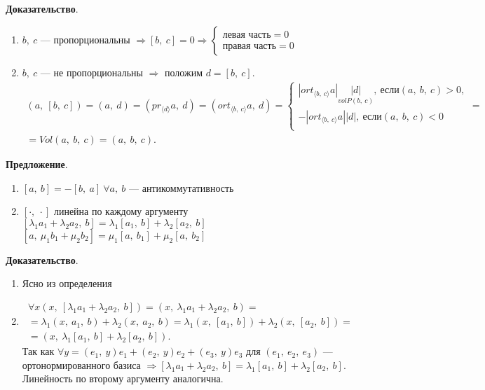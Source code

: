 \documentclass[a4paper, 12pt]{article}
\begin{document}
\textbf{Доказательство}.
\vspace{-3mm}
\begin{enumerate}
\itemsep=0em
\item $b,\ c$ --- пропорциональны $\Longrightarrow [b,\ c] = 0 \Longrightarrow \begin{cases*}
\text{левая часть} = 0 \\
\text{правая часть} = 0
\end{cases*}$
\item $b,\ c$ --- не пропорциональны $\Longrightarrow$ положим $d = [b,\ c]$.
\vspace{-3mm}
\begin{gather*}
(a,\ [b,\ c]) = (a,\ d) = (pr_{\langle d \rangle}a,\ d) = (ort_{\langle b,\ c \rangle}a,\ d) = \begin{cases*}
|ort_{\langle b,\ c \rangle}a|\underset{volP(b,\ c)}{|d|},\ \text{если} (a,\ b,\ c) > 0, \\
-|ort_{\langle b,\ c \rangle}a||d|,\ \text{если} (a,\ b,\ c) < 0 \\
\end{cases*} = \\
= Vol(a,\ b,\ c) = (a,\ b,\ c).
\end{gather*}
\end{enumerate}

\textbf{Предложение}.
\vspace{-3mm}
\begin{enumerate}
\itemsep=-0.3em
\item $[a,\ b] = -[b,\ a]\ \forall a,\ b$ --- антикоммутативность
\item $[\cdot,\ \cdot]$ линейна по каждому аргументу \\
$[\lambda_1 a_1 + \lambda_2 a_2,\ b] = \lambda_1[a_1,\ b] + \lambda_2[a_2,\ b]$ \\
$[a,\ \mu_1b_1 + \mu_2b_2] = \mu_1[a,\ b_1] + \mu_2[a,\ b_2]$
\end{enumerate}

\textbf{Доказательство}.
\vspace{-3mm}
\begin{enumerate}
\itemsep=0em
\item Ясно из определения
\item
\begin{gather*}
\forall x (x,\ [\lambda_1a_1 + \lambda_2a_2,\ b]) = (x,\ \lambda_1a_1 + \lambda_2a_2,\ b) = \\ = \lambda_1(x,\ a_1,\ b) + \lambda_2(x,\ a_2,\ b) = \lambda_1(x,\ [a_1,\ b]) + \lambda_2(x,\ [a_2,\ b]) = \\ = (x,\ \lambda_1[a_1,\ b] + \lambda_2[a_2,\ b]).
\end{gather*}
Так как $\forall y = (e_1,\ y)e_1 + (e_2,\ y)e_2 + (e_3,\ y)e_3$ для $(e_1,\ e_2,\ e_3)$ --- ортонормированного базиса $\Longrightarrow [\lambda_1a_1 + \lambda_2a_2,\ b] = \lambda_1[a_1,\ b] + \lambda_2[a_2,\ b]$. Линейность по второму аргументу аналогична.
\end{enumerate}
\end{document}
